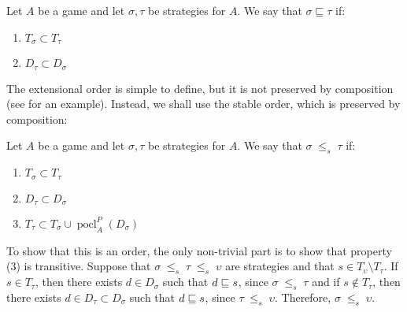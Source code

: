 \documentclass{entcs} \usepackage{prentcsmacro}
\newcommand{\stle}{{\;\le_s\;}}
\newcommand{\exle}{\sqsubseteq}
\DeclareMathOperator{\pocl}{pocl}
\newcommand{\0}{{\mathtt{0}}}
\begin{document}
\begin{definition}
  Let $A$ be a game and let $\sigma,\tau$ be strategies for $A$.  We say that $\sigma\exle\tau$ if:
  
  \begin{enumerate}[1)]
    \item $T_\sigma\subset T_\tau$
    \item $D_\tau\subset D_\sigma$
  \end{enumerate}
\end{definition}

The extensional order is simple to define, but it is not preserved by composition (see \cite{mcCHFiniteND} for an example).  Instead, we shall use the stable order, which is preserved by composition:

\begin{definition}
  Let $A$ be a game and let $\sigma,\tau$ be strategies for $A$.  We say that $\sigma\stle\tau$ if:

  \begin{enumerate}[1)]
    \item $T_\sigma\subset T_\tau$
    \item $D_\tau\subset D_\sigma$
    \item $T_\tau\subset T_\sigma \cup \pocl_A^P(D_\sigma)$
  \end{enumerate}
\end{definition}

To show that this is an order, the only non-trivial part is to show that property (3) is transitive.  Suppose that $\sigma\stle\tau\stle\upsilon$ are strategies and that $s\in T_\upsilon\setminus T_\tau$.  If $s\in T_\tau$, then there exists $d\in D_\sigma$ such that $d\sqsubseteq s$, since $\sigma\stle\tau$ and if $s\not\in T_\tau$, then there exists $d\in D_\tau\subset D_\sigma$ such that $d\sqsubseteq s$, since $\tau\stle\upsilon$.  Therefore, $\sigma\stle\upsilon$.
\end{document}
